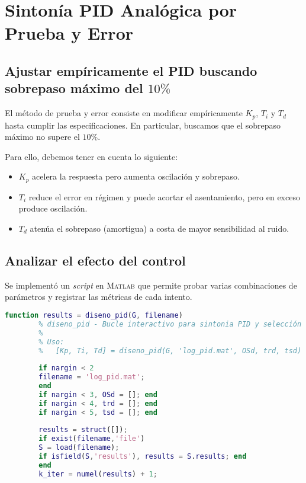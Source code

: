 \section{Sintonía PID Analógica por Prueba y Error}

\subsection{Ajustar empíricamente el PID buscando sobrepaso máximo del \texorpdfstring{$10\%$}{10\%}}

El método de prueba y error consiste en modificar empíricamente $K_p$, $T_i$ y $T_d$ hasta cumplir las especificaciones.  
En particular, buscamos que el sobrepaso máximo no supere el $10\%$.

Para ello, debemos tener en cuenta lo siguiente:
\begin{itemize}
	\item $K_p$ acelera la respuesta pero aumenta oscilación y sobrepaso.
	\item $T_i$ reduce el error en régimen y puede acortar el asentamiento, pero en exceso produce oscilación.
	\item $T_d$ atenúa el sobrepaso (amortigua) a costa de mayor sensibilidad al ruido.
\end{itemize}

\subsection{Analizar el efecto del control}

Se implementó un \textit{script} en \textsc{Matlab} que permite probar varias combinaciones de parámetros y registrar las métricas de cada intento.


\begin{strip}

	\vspace{-\baselineskip} %
	\noindent
	\begin{minipage}{0.98\textwidth}
		
	\begin{lstlisting}[language=Matlab, style=matlabstyle]
		function results = diseno_pid(G, filename)
		% diseno_pid - Bucle interactivo para sintonia PID y selección del mejor ensayo
		%
		% Uso:
		%   [Kp, Ti, Td] = diseno_pid(G, 'log_pid.mat', OSd, trd, tsd)
		
		if nargin < 2
		filename = 'log_pid.mat';
		end
		if nargin < 3, OSd = []; end
		if nargin < 4, trd = []; end
		if nargin < 5, tsd = []; end
		
		results = struct([]);
		if exist(filename,'file')
		S = load(filename);
		if isfield(S,'results'), results = S.results; end
		end
		k_iter = numel(results) + 1;
	\end{lstlisting}
	
\end{minipage}
\vspace{-\baselineskip} %
\end{strip}

